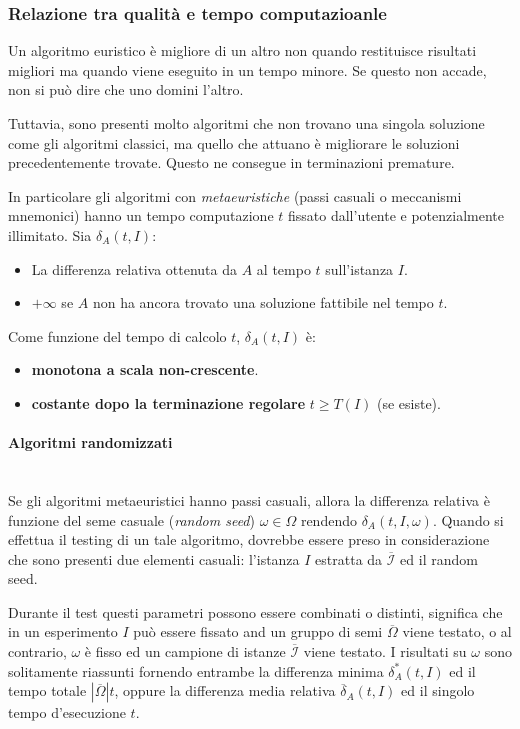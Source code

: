 \documentclass{article}
\newcommand{\ovcal}[1]{\overline{\mathcal{#1}}}
\begin{document}
\subsubsection{Relazione tra qualità e tempo computazioanle}
Un algoritmo euristico è migliore di un altro non quando restituisce risultati migliori ma quando
viene eseguito in un tempo minore. Se questo non accade, non si può dire che uno domini l'altro.

Tuttavia, sono presenti molto algoritmi che non trovano una singola soluzione come gli algoritmi
classici, ma quello che attuano è migliorare le soluzioni precedentemente trovate. Questo ne
consegue in terminazioni premature.

In particolare gli algoritmi con \textit{metaeuristiche} (passi casuali o meccanismi mnemonici)
hanno un tempo computazione $t$ fissato dall'utente e potenzialmente illimitato.
Sia $\delta_A(t,I)$:
\begin{itemize}
    \item La differenza relativa ottenuta da $A$ al tempo $t$ sull'istanza $I$.
    \item $+\infty$ se $A$ non ha ancora trovato una soluzione fattibile nel tempo $t$.
\end{itemize}
Come funzione del tempo di calcolo $t$, $\delta_A(t,I)$ è:
\begin{itemize}
    \item \textbf{monotona a scala non-crescente}.
    \item \textbf{costante dopo la terminazione regolare} $t\geq T(I)$ (se esiste).
\end{itemize}
\paragraph{Algoritmi randomizzati}\mbox{}\\
Se gli algoritmi metaeuristici hanno passi casuali, allora la differenza relativa è funzione del
seme casuale (\textit{random seed}) $\omega\in\Omega$ rendendo $\delta_A(t,I,\omega)$. Quando si effettua
il testing di un tale algoritmo, dovrebbe essere preso in considerazione che sono presenti due
elementi casuali: l'istanza $I$ estratta da $\ovcal{I}$ ed il random seed.

Durante il test questi parametri possono essere combinati o distinti, significa che in un esperimento
$I$ può essere fissato and un gruppo di semi $\overline{\Omega}$ viene testato, o al contrario, $\omega$
è fisso ed un campione di istanze $\ovcal{I}$ viene testato. I risultati su $\omega$ sono solitamente
riassunti fornendo entrambe la differenza minima $\delta_A^*(t,I)$ ed il tempo totale $|\overline{\Omega}|t$,
oppure la differenza media relativa $\overline{\delta}_A(t,I)$ ed il singolo tempo d'esecuzione $t$.
\end{document}
